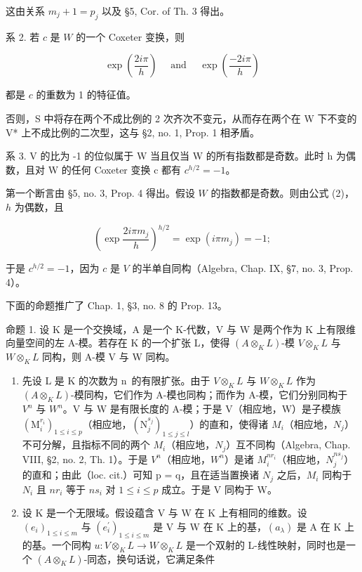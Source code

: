这由关系 \(m_j + 1 = p_j\) 以及 §5, Cor. of Th. 3 得出。

系 2. 若 \(c\) 是 \(W\) 的一个 Coxeter 变换，则

\[
\exp \left(\frac {2 i \pi}{h}\right) \quad \text { and } \quad \exp \left(\frac {- 2 i \pi}{h}\right)
\]

都是 \(c\) 的重数为 1 的特征值。

否则，S 中将存在两个不成比例的 2 次齐次不变元，从而存在两个在 W 下不变的 V* 上不成比例的二次型，这与 §2, no. 1, Prop. 1 相矛盾。

系 3. V 的比为 -1 的位似属于 W 当且仅当 W 的所有指数都是奇数。此时 h 为偶数，且对 W 的任何 Coxeter 变换 c 都有 \(c^{h/2} = -1\)。

第一个断言由 §5, no. 3, Prop. 4 得出。假设 \(W\) 的指数都是奇数。则由公式 (2)，\(h\) 为偶数，且

\[
\left(\exp \frac {2 i \pi m _ {j}}{h}\right) ^ {h / 2} = \exp (i \pi m _ {j}) = - 1;
\]

于是 \(c^{h/2} = -1\)，因为 \(c\) 是 \(V\) 的半单自同构（Algebra, Chap. IX, §7, no. 3, Prop. 4）。


下面的命题推广了 Chap. 1, §3, no. 8 的 Prop. 13。

命题 1. 设 K 是一个交换域，A 是一个 K-代数，V 与 W 是两个作为 K 上有限维向量空间的左 A-模。若存在 K 的一个扩张 L，使得 \((A \otimes_{K} L)\)-模 \(V \otimes_{K} L\) 与 \(W \otimes_{K} L\) 同构，则 A-模 V 与 W 同构。

\begin{enumerate}
\def\labelenumi{\alph{enumi})}
\item
  先设 L 是 K 的次数为 n~的有限扩张。由于 \(V \otimes_{K} L\) 与 \(W \otimes_{K} L\) 作为 \((A \otimes_{K} L)\)-模同构，它们作为 A-模也同构；而作为 A-模，它们分别同构于 \(V^{n}\) 与 \(W^{n}\)。V 与 W 是有限长度的 A-模；于是 V（相应地，W）是子模族 \((\mathrm{M}_{i}^{r_{i}})_{1 \leqslant i \leqslant p}\)（相应地，\((\mathrm{N}_{j}^{s_{j}})_{1 \leqslant j \leqslant l}\)）的直和，使得诸 \(M_{i}\)（相应地，\(N_{j}\)）不可分解，且指标不同的两个 \(M_{i}\)（相应地，\(N_{j}\)）互不同构（Algebra, Chap. VIII, §2, no. 2, Th. 1）。于是 \(V^{n}\)（相应地，\(W^{n}\)）是诸 \(M_{i}^{nr_{i}}\)（相应地，\(N_{j}^{ns_{j}}\)）的直和；由此（loc. cit.）可知 p = q，且在适当置换诸 \(N_{j}\) 之后，\(M_{i}\) 同构于 \(N_{i}\) 且 \(nr_{i}\) 等于 \(ns_{i}\) 对 \(1 \leqslant i \leqslant p\) 成立。于是 V 同构于 W。
\item
  设 K 是一个无限域。假设蕴含 V 与 W 在 K 上有相同的维数。设 \((e_{i})_{1\leqslant i\leqslant m}\) 与 \((e_{i}^{\prime})_{1\leqslant i\leqslant m}\) 是 V 与 W 在 K 上的基，\((a_{\lambda})\) 是 A 在 K 上的基。一个同构 \(u:V\otimes_{K}L\to W\otimes_{K}L\) 是一个双射的 L-线性映射，同时也是一个 \((A\otimes_{K}L)\)-同态，换句话说，它满足条件
\end{enumerate}

